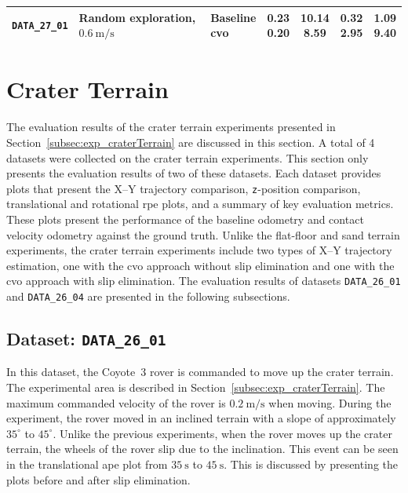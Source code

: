 \documentclass[report.tex]{subfiles}
\begin{document}
\begin{table}[!htbp]
\begin{tabularx}{\textwidth}{
            >{\raggedright\arraybackslash}m{1.55cm}
            >{\raggedright\arraybackslash}X
            l
            cccc
        }
            \texttt{DATA\_27\_01}
            & Random exploration, $0.6~\mathrm{m/s}$
            & \makecell[l]{Baseline\\\gls{cvo}}
            & \makecell{0.23\\\textbf{0.20}}
            & \makecell{10.14\\\textbf{8.59}}
            & \makecell{\textbf{0.32}\\2.95}
            & \makecell{\textbf{1.09}\\9.40} \\

            \bottomrule
        \end{tabularx}
    \end{table}
          
    \section{Crater Terrain} \label{sec:craterTerrainResults}
        
    The evaluation results of the crater terrain experiments presented in Section~\ref{subsec:exp_craterTerrain} are discussed in this section. A total of 4 datasets were collected on the crater terrain experiments. This section only presents the evaluation results of two of these datasets. Each dataset provides plots that present the X--Y trajectory comparison, \texttt{z}-position comparison, translational and rotational \gls{rpe} plots, and a summary of key evaluation metrics. These plots present the performance of the baseline odometry and contact velocity odometry against the ground truth. Unlike the flat-floor and sand terrain experiments, the crater terrain experiments include two types of X--Y trajectory estimation, one with the \gls{cvo} approach without slip elimination and one with the \gls{cvo} approach with slip elimination. The evaluation results of datasets \texttt{DATA\_26\_01} and \texttt{DATA\_26\_04} are presented in the following subsections. 
    
    \subsection{Dataset: \texttt{DATA\_26\_01}}

    In this dataset, the Coyote~3 rover is commanded to move up the crater terrain. The experimental area is described in Section~\ref{subsec:exp_craterTerrain}. The maximum commanded velocity of the rover is $0.2~\mathrm{m/s}$ when moving. During the experiment, the rover moved in an inclined terrain with a slope of approximately $35^{\circ}$ to $45^{\circ}$. Unlike the previous experiments, when the rover moves up the crater terrain, the wheels of the rover slip due to the inclination. This event can be seen in the translational \gls{ape} plot from $35~\mathrm{s}$ to $45~\mathrm{s}$. This is discussed by presenting the plots before and after slip elimination. 
\end{document}
